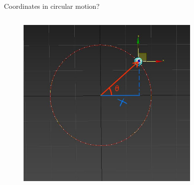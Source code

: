 \documentclass[]{beamer}
\begin{document}
 \begin{frame}

    Coordinates in circular motion?
    
 
        
   
 
           \begin{columns}[c]
             \column{2.3in}  %
  
           
 
             \column{2.5in}
             
       
             \begin{figure}[h!]  
                 \includegraphics[width=0.8\textwidth]{images/32.jpg}
             
               \end{figure}
               
               
               
                
          
             \end{columns}
 
 
 
      
        \end{frame}
\end{document}
